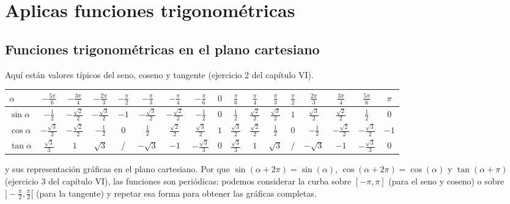 \chapter{Aplicas funciones trigonométricas}

\section{Funciones trigonométricas en el plano cartesiano}

Aquí están valores típicos del seno, coseno y tangente (ejercicio 2 del capítulo
VI).

  \begin{center}
  \begin{tabular}{| l | c | c | c | c | c | c | c | c | c | c | c | c | c | c | c | c |}
    \hline
    $\alpha$ &
    $-\frac{5\pi}{6}$ &
    $-\frac{3\pi}{4}$ &
    $-\frac{2\pi}{3}$ &
    $-\frac{\pi}{2}$ &
    $-\frac{\pi}{3}$ &
    $-\frac{\pi}{4}$ &
    $-\frac{\pi}{6}$ &
    $0$ &
    $\frac{\pi}{6}$ &
    $\frac{\pi}{4}$ &
    $\frac{\pi}{3}$ &
    $\frac{\pi}{2}$ &
    $\frac{2\pi}{3}$ &
    $\frac{3\pi}{4}$ &
    $\frac{5\pi}{6}$ &
    $\pi$ \\
    \hline
    $\sin \alpha$ & 
    $-\frac{1}{2}$ &
    $-\frac{\sqrt{2}}{2}$ &
    $-\frac{\sqrt{3}}{2}$ &
    $-1$ &
    $-\frac{\sqrt{3}}{2}$ &
    $-\frac{\sqrt{2}}{2}$ &
    $-\frac{1}{2}$ &
    $0$ &
    $\frac{1}{2}$ &
    $\frac{\sqrt{2}}{2}$ &
    $\frac{\sqrt{3}}{2}$ &
    $1$ &
    $\frac{\sqrt{3}}{2}$ &
    $\frac{\sqrt{2}}{2}$ &
    $\frac{1}{2}$ &
    $0$
    \\
    \hline
    $\cos \alpha$ &
    $-\frac{\sqrt{3}}{2}$ &
    $-\frac{\sqrt{2}}{2}$ &
    $-\frac{1}{2}$ &
    $0$ &
    $\frac{1}{2}$ &
    $\frac{\sqrt{2}}{2}$ &
    $\frac{\sqrt{3}}{2}$ &
    $1$ &
    $\frac{\sqrt{3}}{2}$ &
    $\frac{\sqrt{2}}{2}$ &
    $\frac{1}{2}$ &
    $0$ &
    $-\frac{1}{2}$ &
    $-\frac{\sqrt{2}}{2}$ &
    $-\frac{\sqrt{3}}{2}$ &
    $-1$
    \\
    \hline
    $\tan \alpha$ & 
    $\frac{\sqrt{3}}{3}$ &
    $1$ &
    $\sqrt{3}$ &
    / &
    $-\sqrt{3}$ &
    $-1$ &
    $-\frac{\sqrt{3}}{3}$ &
    $0$ &
    $\frac{\sqrt{3}}{3}$ &
    $1$ &
    $\sqrt{3}$ &
    / &
    $-\sqrt{3}$ &
    $-1$ &
    $-\frac{\sqrt{3}}{3}$ &
    $0$
    \\
    \hline
  \end{tabular}
  \end{center}

y sus representación gráficas en el plano cartesiano. Por que
$\sin\left(\alpha+2\pi\right) = \sin\left(\alpha\right)$,
$\cos\left(\alpha+2\pi\right) = \cos\left(\alpha\right)$ y
$\tan\left(\alpha+\pi\right)$ (ejercicio 3 del capítulo VI), las funciones son
periódicas: podemos considerar la curba sobre $[-\pi,\pi]$ (para el seno
y coseno) o sobre $]-\frac{\pi}{2}, \frac{\pi}{2}[$ (para la tangente) y
repetar esa forma para obtener las gráficas completas.

